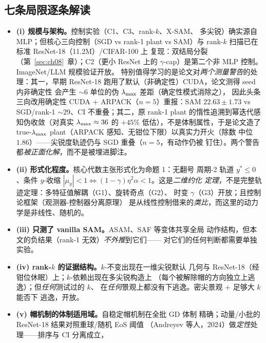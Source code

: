 \subsection{七条局限逐条解读}\label{sec:ch10-limits}

\begin{itemize}
  \item \textbf{(i) 规模与架构。}控制实验（C1、C3、rank-$k$、X-SAM、
        多尖锐）确实源自 MLP；但核心三向控制（SGD vs rank-1 plant vs
        SAM）与 rank-$k$ 扫描已在标准 ResNet-18（11.2M）/CIFAR-100 上
        复现：双结局分裂（第~\ref{sec:ch08}~章）；C2（更小 ResNet 上的
        $\gamma$-cap）是第二个非 MLP 控制。ImageNet/LLM 规模验证开放。
        特别值得学习的是论文对\emph{两个测量警告}的处理：其一，早期
        ResNet-18 跑用了默认（非确定性）CUDA，论文测得 seed 内非确定性
        会产生 ${\sim}6$ 单位的伪 $\lambda_{\max}$ 差距（确定性模式消除之），
        因此头条三向改用确定性 CUDA + ARPACK（$n=5$）重报：SAM
        $22.63\pm1.73$ vs SGD/rank-1 ${\sim}29$、CI 不重叠；其二，原
        rank-1 plant 的惰性追溯到幂迭代感知伪收敛（对真实
        $\lambda_{\max}\approx36$ 的 $+45\%$ 低估），不是体制属性，于是论文造了
        true-$\lambda_{\max}$ plant（ARPACK 感知、无钳位下限）以真实力开火（除数
        中位 $1.86$）——尖锐度轨迹仍与 SGD 重叠（$n=5$，有动作仍被
        钉住）。两个警告都\emph{被正面化解}，而不是被埋进脚注。
  \item \textbf{(ii) 形式化程度。}核心代数主张形式化为命题 1：无翻号
        周期-2 轨道 $y^{*}\le0$、条件 $y$-收缩
        $|\mu_y|<1\iff(1-\gamma)\eta^2\alpha<1$。这是\emph{二维约化
        定理}，不是完整轨迹定理：多特征值解耦（G1）、旋转奇点（G2）、
        时变 $\gamma$（G3）开放；且控制论框架（观测器-控制器分离原理）
        是从线性控制借来的\emph{类比}，而这里的动力学是非线性、随机的。
  \item \textbf{(iii) 只测了 vanilla SAM。}ASAM、SAF 等变体共享全局
        动作结构，但本文的负结果（rank-1 无效）\emph{不外推}到它们——
        对它们的任何判断都需要单独实验。
  \item \textbf{(iv) rank-$k$ 的证据结构。}$k$-不变出现在一维尖锐默认
        几何与 ResNet-18（经钳位休眠）上；$k$-依赖出现在多尖锐构造上
        （每个被解除帽的方向独立上逃逸）；但\emph{任何}测试过的 $k$、
        在\emph{任何}景观上都没有下逃逸。密尖景观 + 足够大 $k$ 能否下
        逃逸，开放。
  \item \textbf{(v) 帽机制的体制适用域。}自稳定帽机制在全批 GD 体制
        精确；动量/小批的 ResNet-18 结果对照重球/随机 EoS 阈值
        （Andreyev 等人，2024）做\emph{定性}处理——排序与 CI 分离成立，

\end{itemize}
